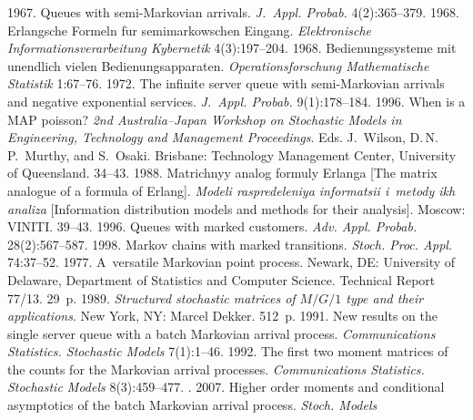 \begin{multicols}{2}
{{\begin{thebibliography}{99}
   1967. Queues with semi-Markovian arrivals. \textit{J.~Appl. Probab.} 4(2):365--379.
   1968. Erlangsche Formeln f$\ddot{\mbox{u}}$r semimarkowschen Eingang. 
\textit{Elektronische Informationsverarbeitung  Kybernetik} 4(3):197--204.
   1968. Bedienungssysteme mit unendlich vielen 
Bedienungsapparaten. \textit{Operationsforschung Mathematische Statistik} 1:67--76.
   1972. The infinite server queue with semi-Markovian arrivals 
and negative exponential services. \textit{J.~Appl. Probab.} 9(1):178--184.
   1996. When is a MAP poisson? \textit{2nd 
  Australia--Japan Workshop on Stochastic Models in Engineering, Technology and Management 
Proceedings}. Eds. J.~Wilson, D.\,N.\,P.~Murthy, and S.~Osaki. 
Brisbane: Technology Management Center, University of Queensland. 34--43.
   1988. Matrichnyy analog formuly Erlanga [The matrix analogue of a formula of 
Erlang]. \textit{Modeli raspredeleniya informatsii i~metody ikh analiza} [Information distribution 
models and methods for their analysis]. Moscow: VINITI. 39--43.
   1996. Queues with marked customers. \textit{Adv. Appl. Probab.} 
28(2):567--587.
   1998. Markov chains with marked transitions. \textit{Stoch. 
Proc. Appl.} 74:37--52.
   1977. A~versatile Markovian point process.  
Newark, DE: University of Delaware, Department of Statistics and Computer Science.
Technical Report 77/13. 29~p.
   1989. \textit{Structured stochastic matrices of $M/G/1$ type and their 
applications}. New York, NY: Marcel Dekker. 512~p.
   1991. New results on the single server queue with a batch Markovian arrival 
process. \textit{Communications Statistics. Stochastic Models} 7(1):1--46. 
   1992. The first two moment matrices of the counts for the 
Markovian arrival processes. \textit{Communications Statistics. Stochastic Models} 8(3):459--477. 
  . 2007. Higher order 
moments and conditional asymptotics of the batch Markovian arrival process. \textit{Stoch. Models} 

\end{thebibliography}}}
\end{multicols}

